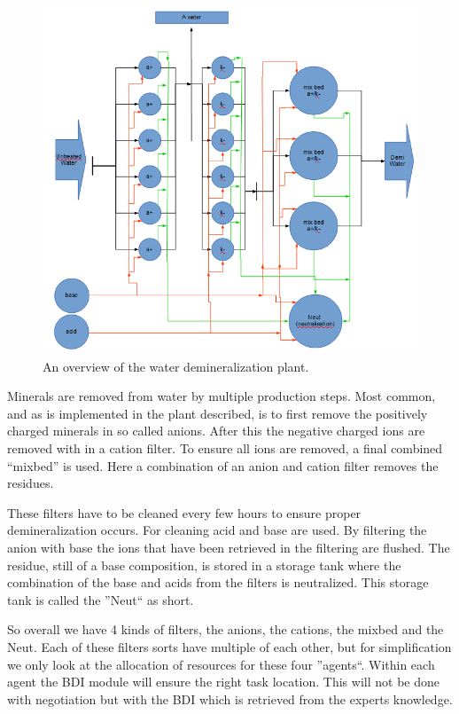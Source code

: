 \begin{figure}
	\centering
	\includegraphics[width=1\linewidth]{img/demi-plant}
	\caption{An overview of the water demineralization plant.}
	\label{fig:demi-plant}
\end{figure}

Minerals are removed from water by multiple production steps. Most common, and as is implemented in the plant described, is to first remove the positively charged minerals in so called anions. After this the negative charged ions are removed with in a cation filter. To ensure all ions are removed, a final combined ``mixbed'' is used. Here a combination of an anion and cation filter removes the residues.

These filters have to be cleaned every few hours to ensure proper demineralization occurs. For cleaning acid and base are used. By filtering the anion with base the ions that have been retrieved in the filtering are flushed. The residue, still of a base composition, is stored in a storage tank where the combination of the base and acids from the filters is neutralized. This storage tank is called the ''Neut`` as short.

So overall we have 4 kinds of filters, the anions, the cations, the mixbed and the Neut. Each of these filters sorts have multiple of each other, but for simplification we only look at the allocation of resources for these four ''agents``. Within each agent the BDI module will ensure the right task location. This will not be done with negotiation but with the BDI which is retrieved from the experts knowledge.


